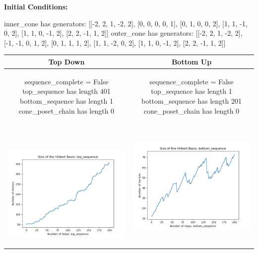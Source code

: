 \documentclass[10pt]{article}
\begin{document}
\textbf{Initial Conditions:}
\begin{SAGE}
inner_cone has generators: 
[[-2, 2, 1, -2, 2], [0, 0, 0, 0, 1], [0, 1, 0, 0, 2], [1, 1, -1, 0, 2], [1, 1, 0, -1, 2], [2, 2, -1, 1, 2]]
outer_cone has generators: 
[[-2, 2, 1, -2, 2], [-1, -1, 0, 1, 2], [0, 1, 1, 1, 2], [1, 1, -2, 0, 2], [1, 1, 0, -1, 2], [2, 2, -1, 1, 2]]

\end{SAGE}
\begin{tabular}{c|c}
\textbf{Top Down} & \textbf{Bottom Up} \\ \hline  
\begin{SAGE}
	sequence_complete = False
	top_sequence has length 401
	bottom_sequence has length 1
	cone_poset_chain has length 0
\end{SAGE} 
&
\begin{SAGE}
	sequence_complete = False
	top_sequence has length 1
	bottom_sequence has length 201
	cone_poset_chain has length 0
\end{SAGE} 
\\ \hline
\
\begin{minipage}{.45\textwidth}
\includegraphics[width=\textwidth]{"DATA/5d/6 generators 2 bound I/top_sequence SIZE"}
\end{minipage} &
\begin{minipage}{.45\textwidth}
\includegraphics[width=\textwidth]{"DATA/5d/6 generators 2 bound I bottomup/bottom_sequence SIZE"}

\end{minipage}
\end{tabular}
\end{document}
